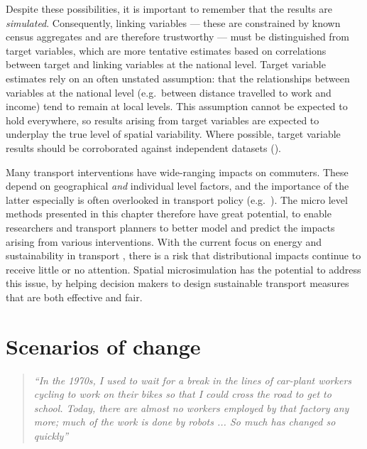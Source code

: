 \documentclass[a4paper, 11pt, twoside]{Thesis}
\begin{document}
Despite these possibilities, it is important to remember that the results are
\emph{simulated}. Consequently, 
linking variables --- these
are constrained by known census aggregates and are therefore trustworthy ---
must be distinguished from target variables, which are more tentative
estimates based on correlations between target and linking
variables at the national level. Target variable
estimates rely on an often unstated assumption: that the relationships
between variables at the national level (e.g.~between distance travelled to
work and income) tend to remain at local levels. This assumption cannot be
expected to hold everywhere, so results arising from target variables are
expected to underplay the true level of spatial variability. Where possible,
target variable results should be corroborated against independent datasets
(\citealp{Edwards2009}).

Many transport interventions have wide-ranging impacts on commuters.
These depend on geographical \emph{and} individual level factors,
and the importance of the latter especially is often overlooked in transport policy
 (e.g.~\citealp{Tribby2012}).
The micro level methods presented in this chapter therefore have great potential,
to enable researchers and transport planners to better model and predict the
impacts arising from various interventions.
With the current focus on energy and sustainability in transport
\citep{Chapman2007}, there is a risk that distributional impacts continue
to receive little or no attention. Spatial microsimulation
has the potential to address this issue, by helping
decision makers to design sustainable transport measures
that are both effective and fair.
 
\chapter{Scenarios of change} 
\label{Chapter8}

\fancyhead[RE,LO]{\thepage}

\begin{quote}
\textit{ ``In the 1970s, I used to wait for a break in the lines
of car-plant workers cycling to work on their bikes so that I
could cross the road to get to school. Today, there are almost
no workers employed by that factory any more; much of the work is done by
robots ... So much has changed so quickly''}
\end{quote}
\begin{flushright}
\citet[p.~106]{dorling2013population}
\end{flushright}
\end{document}

